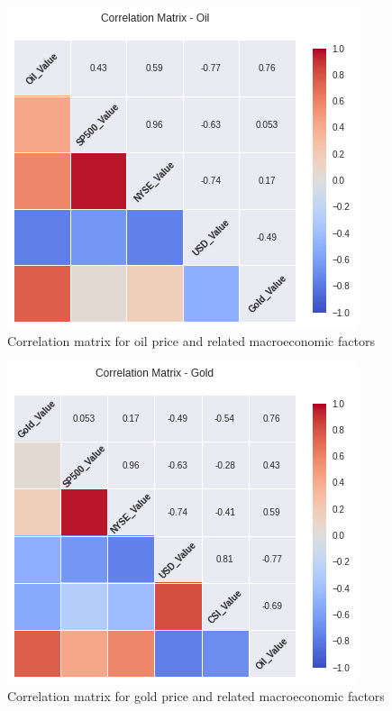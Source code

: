 \documentclass[runningheads]{llncs}
\begin{document}
\begin{figure}
\centering
\includegraphics[width=\textwidth]{Correlation_Oil_Value_.png}
\caption{Correlation matrix for oil price and related macroeconomic factors}
\label{fig:Correlation_Oil_Value_.png}
\end{figure}

\begin{figure}
\centering
\includegraphics[width=\textwidth]{Correlation_Gold_Value_.png}
\caption{Correlation matrix for gold price and related macroeconomic factors}
\label{fig:Correlation_Gold_Value_.png}
\end{figure}
\end{document}

